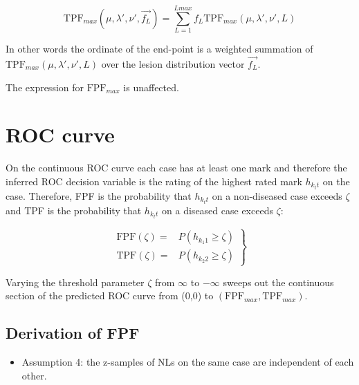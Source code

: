 \documentclass[
]{book}
\providecommand{\tightlist}{%
  \setlength{\itemsep}{0pt}\setlength{\parskip}{0pt}}
\begin{document}
\begin{equation}
\text{TPF}_{max} \left ( \mu, \lambda', \nu', \overrightarrow{f_L} \right ) = \sum_{L=1}^{L{max}}  f_L \text{TPF}_{max} \left ( \mu, \lambda', \nu', L \right )
\label{eq:rsm-pred-tpf-max-fl1}
\end{equation}

In other words the ordinate of the end-point is a weighted summation of \(\text{TPF}_{max} \left ( \mu, \lambda', \nu', L \right )\) over the lesion distribution vector \(\overrightarrow{f_L}\).

The expression for \(\text{FPF}_{max}\) is unaffected.

\hypertarget{rsm-pred-roc-curve}{%
\section{ROC curve}\label{rsm-pred-roc-curve}}

On the continuous ROC curve each case has at least one mark and therefore the inferred ROC decision variable is the rating of the highest rated mark \(h_{k_t t}\) on the case. Therefore, FPF is the probability that \(h_{k_t t}\) on a non-diseased case exceeds \(\zeta\) and TPF is the probability that \(h_{k_t t}\) on a diseased case exceeds \(\zeta\):

\begin{equation}
\left. 
\begin{aligned}
\text{FPF}\left (\zeta  \right ) =& P\left ( h_{k_1 1} \geq \zeta \right )\\
\text{TPF}\left (\zeta  \right ) =& P\left ( h_{k_2 2} \geq \zeta \right )
\end{aligned}
\right \}
\label{eq:rsm-pred-tpf-fpf-zeta}
\end{equation}

Varying the threshold parameter \(\zeta\) from \(\infty\) to \(-\infty\) sweeps out the continuous section of the predicted ROC curve from (0,0) to \(\left (\text{FPF}_{max}, \text{TPF}_{max} \right )\).

\hypertarget{rsm-pred-roc-curve-fpf}{%
\subsection{Derivation of FPF}\label{rsm-pred-roc-curve-fpf}}

\begin{itemize}
\tightlist
\item
  Assumption 4: the z-samples of NLs on the same case are independent of each other.
\end{itemize}
\end{document}
